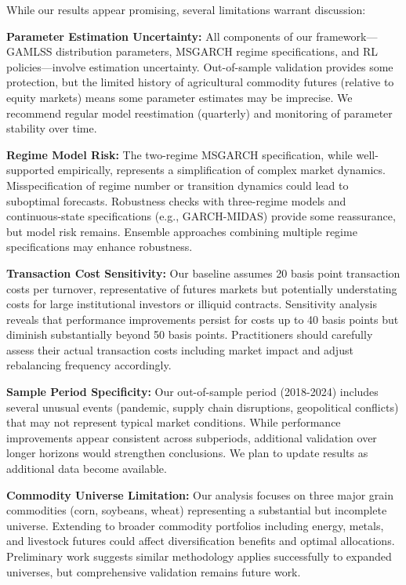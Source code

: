 \documentclass[
  10pt,
  a4paper,
]{article}
\begin{document}
\begin{tcolorbox}
While our results appear promising, several limitations warrant
discussion:

\textbf{Parameter Estimation Uncertainty:} All components of our
framework---GAMLSS distribution parameters, MSGARCH regime
specifications, and RL policies---involve estimation uncertainty.
Out-of-sample validation provides some protection, but the limited
history of agricultural commodity futures (relative to equity markets)
means some parameter estimates may be imprecise. We recommend regular
model reestimation (quarterly) and monitoring of parameter stability
over time.

\textbf{Regime Model Risk:} The two-regime MSGARCH specification, while
well-supported empirically, represents a simplification of complex
market dynamics. Misspecification of regime number or transition
dynamics could lead to suboptimal forecasts. Robustness checks with
three-regime models and continuous-state specifications (e.g.,
GARCH-MIDAS) provide some reassurance, but model risk remains. Ensemble
approaches combining multiple regime specifications may enhance
robustness.

\textbf{Transaction Cost Sensitivity:} Our baseline assumes 20 basis
point transaction costs per turnover, representative of futures markets
but potentially understating costs for large institutional investors or
illiquid contracts. Sensitivity analysis reveals that performance
improvements persist for costs up to 40 basis points but diminish
substantially beyond 50 basis points. Practitioners should carefully
assess their actual transaction costs including market impact and adjust
rebalancing frequency accordingly.

\textbf{Sample Period Specificity:} Our out-of-sample period (2018-2024)
includes several unusual events (pandemic, supply chain disruptions,
geopolitical conflicts) that may not represent typical market
conditions. While performance improvements appear consistent across
subperiods, additional validation over longer horizons would strengthen
conclusions. We plan to update results as additional data become
available.

\textbf{Commodity Universe Limitation:} Our analysis focuses on three
major grain commodities (corn, soybeans, wheat) representing a
substantial but incomplete universe. Extending to broader commodity
portfolios including energy, metals, and livestock futures could affect
diversification benefits and optimal allocations. Preliminary work
suggests similar methodology applies successfully to expanded universes,
but comprehensive validation remains future work.


\end{tcolorbox}
\end{document}
